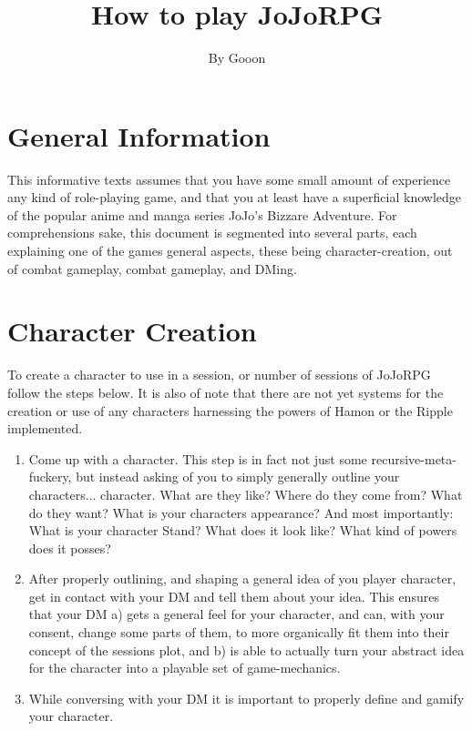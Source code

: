 \documentclass[a4paper,12pt]{article}
\begin{document}
\title{\Large{\textbf{How to play JoJoRPG}}}
\author{By Gooon}

\maketitle


\section{General Information}
This informative texts assumes that you have some small amount of experience any kind of role-playing game, and that you at least have a superficial knowledge of the popular anime and manga series JoJo's Bizzare Adventure. For comprehensions sake, this document is segmented into several parts, each explaining one of the games general aspects, these being character-creation, out of combat gameplay, combat gameplay, and DMing.
\section{Character Creation}
To create a character to use in a session, or number of sessions of JoJoRPG follow the steps below. It is also of note that there are not yet systems for the creation or use of any characters harnessing the powers of Hamon or the Ripple implemented.
\begin{enumerate}
	\item Come up with a character. This step is in fact not just some recursive-meta-fuckery, but instead asking of you to simply generally outline your characters... character. What are they like? Where do they come from? What do they want? What is your characters appearance? And most importantly: What is your character Stand? What does it look like? What kind of powers does it posses?
	\item After properly outlining, and shaping a general idea of you player character, get in contact with your DM and tell them about your idea. This ensures that your DM a) gets a general feel for your character, and can, with your consent, change some parts of them, to more organically fit them into their concept of the sessions plot, and b) is able to actually turn your abstract idea for the character into a playable set of game-mechanics.
	\item While conversing with your DM it is important to properly define and gamify your character.
\end{enumerate}
\end{document}

